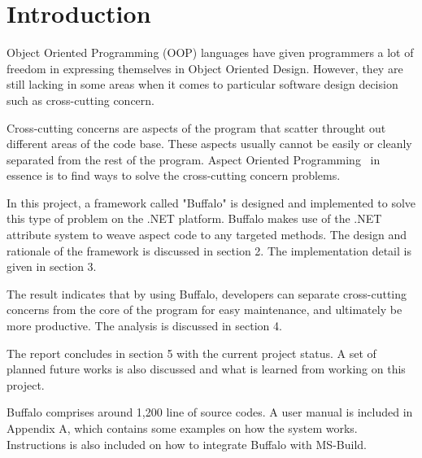 \chapter{Introduction}

Object Oriented Programming (OOP) languages have given programmers a lot of freedom in expressing themselves in Object Oriented Design. However, they are still lacking in some areas when it comes to particular software design decision such as cross-cutting concern.

Cross-cutting concerns are aspects of the program that scatter throught out different areas of the code base. These aspects usually cannot be easily or cleanly separated from the rest of the program. Aspect Oriented Programming~\cite{aop} in essence is to find ways to solve the cross-cutting concern problems.

In this project, a framework called "Buffalo" is designed and implemented to solve this type of problem on the .NET platform. Buffalo makes use of the .NET attribute system to weave aspect code to any targeted methods. The design and rationale of the framework is discussed in section 2. The implementation detail is given in section 3.

The result indicates that by using Buffalo, developers can separate cross-cutting concerns from the core of the program for easy maintenance, and ultimately be more productive. The analysis is discussed in section 4.

The report concludes in section 5 with the current project status. A set of planned future works is also discussed and what is learned from working on this project.

Buffalo comprises around 1,200 line of source codes. A user manual is included in Appendix A, which contains some examples on how the system works. Instructions is also included on how to integrate Buffalo with MS-Build.
